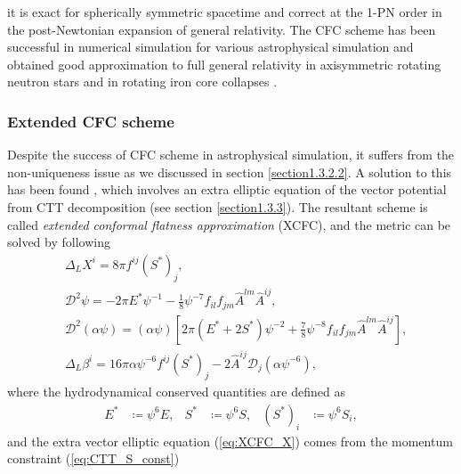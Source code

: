 it is exact for spherically symmetric spacetime \cite{cordero2011maximal} and
correct at the 1-PN order in the post-Newtonian expansion of general relativity.
The CFC scheme has been successful in numerical simulation for various astrophysical simulation
\cite{dimmelmeier2002relativistic,oechslin2002conformally,saijo2004collapse,bauswein2012equation,bauswein2013systematics,bauswein2014revealing,muller2015dynamics,dimmelmeier2006non} 
and obtained good approximation to full general relativity in axisymmetric rotating neutron stars 
\cite{dimmelmeier2002relativistic,dimmelmeier2006non,cook1996testing}
and in rotating iron core collapses \cite{ott2007rotating}.

\subsubsection{Extended CFC scheme}
\label{section_XCFC}
Despite the success of CFC scheme in astrophysical simulation,
it suffers from the non-uniqueness issue as we discussed in section \ref{section1.3.2.2}.
A solution to this has been found \cite{cordero2009improved,saijo2004collapse,shibata2006merger},
which involves an extra elliptic equation of the vector potential from CTT decomposition (see section \ref{section1.3.3}).
The resultant scheme is called \textit{extended conformal flatness approximation} (XCFC),
and the metric can be solved by following
\begin{align}
    & \Delta_L X^i = 8\pi f^{ij} \left(S^{*}\right)_j, \label{eq:XCFC_X}\\
    & \mathcal{D}^2 \psi = - 2\pi E^{*} \psi^{-1} - \frac{1}{8} \psi^{-7}f_{il}f_{jm} \hat{A}^{lm} \hat{A}^{ij}, \label{eq:XCFC_psi}\\
    & \mathcal{D}^2 \left(\alpha \psi \right) = \left( \alpha \psi \right) \left[ 2\pi \left( E^{*} + 2 S^{*} \right) \psi^{-2}
    + \frac{7}{8} \psi^{-8} f_{il}f_{jm} \hat{A}^{lm} \hat{A}^{ij} \right], \label{eq:XCFC_alp}\\
    & \Delta_L \beta^i = 16 \pi \alpha \psi^{-6} f^{ij} \left(S^{*}\right)_{j} - 2 \hat{A}^{ij} \mathcal{D}_j \left(\alpha \psi^{-6} \right), \label{eq:XCFC_beta}
\end{align}
where the hydrodynamical conserved quantities are defined as
\begin{align}
    E^* &\coloneqq \psi^6 E, & S^* & \coloneqq \psi^6 S, & \left(S^*\right)_i &\coloneqq \psi^6 S_i,
\end{align}
and the extra vector elliptic equation (\ref{eq:XCFC_X}) comes from the momentum constraint (\cref{eq:CTT_S_const}) 
